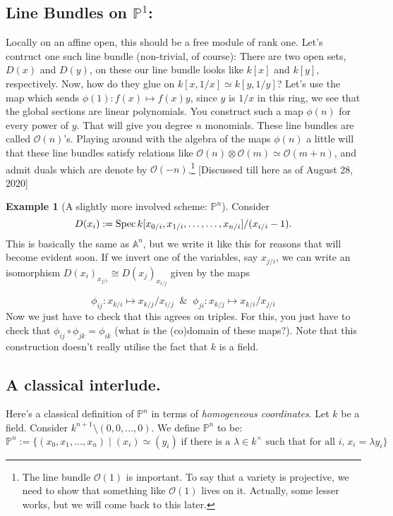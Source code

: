 \documentclass[11pt]{amsart}
\newcommand{\Spec}{{\rm Spec \,}}
\newcommand{\sO}{{\mathcal O}}
\newcommand{\A}{{\mathbb A}}
\renewcommand{\P}{{\mathbb P}}
\theoremstyle{definition}
\newtheorem{example}[theorem]{Example}
\begin{document}
\subsection{Line Bundles on \texorpdfstring{$\P^1$}{P1}:}
 Locally on an affine open, this should be a free module of rank one. Let's contruct one such line bundle (non-trivial, of course): There are two open sets, $D(x)$ and $D(y)$, on these our line bundle looks like $k[x]$ and $k[y]$, respectively. Now, how do they glue on $k[x,1/x]\simeq k[y,1/y]$? Let's use the map which sends $\phi(1):f(x)\mapsto f(x)y$, since $y$ is $1/x$ in this ring, we see that the global sections are linear polynomials. You construct such a map $\phi(n)$ for every power of $y$. That will give you degree $n$ monomials. These line bundles are called $\sO(n)$'s. Playing around with the algebra of the maps $\phi(n)$ a little will that these line bundles satisfy relations like $\sO(n)\otimes\sO(m)\simeq \sO(m+n)$, and admit duals which are denote by $\sO(-n)$.\footnote{The line bundle $\sO(1)$ is important. To say that a variety is projective, we need to show that something like $\sO(1)$ lives on it. Actually, some lesser works, but we will come back to this later.}
[Discussed till here as of August 28, 2020]


\begin{example}[A slightly more involved scheme: \texorpdfstring{$\P^n$}{Pn}]
Consider 
\[D(x_i):= \Spec k[x_{0/i},x_{1/i},\ldots,\ldots,x_{n/i}]/(x_{i/i}-1).\]
This is basically the same as $\A^n$, but we write it like this for reasons that will become evident soon. If we invert one of the variables, say $x_{j/i}$, we can write an isomorphism $D(x_i)_{x_{j/i}}\cong D(x_j)_{x_{i/j}}$ given by the maps 

\[\phi_{ij}:x_{k/i}\mapsto x_{k/j}/x_{i/j}\;\; \&\;\; \phi_{ji}:x_{k/j}\mapsto x_{k/i}/x_{j/i}\]
Now we just have to check that this agrees on triples. For this, you just have to check that $\phi_{ij}\circ\phi_{jk}=\phi_{ik}$ (what is the (co)domain of these maps?). Note that this construction doesn't really utilise the fact that $k$ is a field.
\end{example}

\subsection{A classical interlude.} Here's a classical definition of $\P^n$ in terms of \textit{homogeneous coordinates}. Let $k$ be a field. Consider $k^{n+1}\setminus{(0,0,\ldots,0)}$. We define $\P^n$ to be:
\[\P^n:=\lbrace (x_0,x_1,\ldots,x_n)\; |\; (x_i)\simeq (y_i)\; \text{if there is a $\lambda\in k^{\times}$ such that for all $i$,}\; x_i=\lambda y_i\rbrace\]
\end{document}
